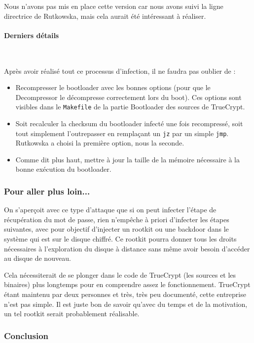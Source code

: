 \documentclass[12pt,a4paper]{article}
\begin{document}
Nous n'avons pas mis en place cette version car nous avons suivi la ligne
directrice de Rutkowska, mais cela aurait été intéressant à réaliser.


\paragraph{Derniers détails} ~

Après avoir réalisé tout ce processus d'infection, il ne faudra pas oublier de :
\begin{itemize}
    \item Recompresser le bootloader avec les bonnes options (pour que le
    Decompressor le décompresse correctement lors du boot). Ces options sont
    visibles dans le \texttt{Makefile} de la partie Bootloader des sources de TrueCrypt.
    \item Soit recalculer la checksum du bootloader infecté une fois recompressé,
    soit tout simplement l'outrepasser en remplaçant un \texttt{jz} par un simple
    \texttt{jmp}. Rutkowska a choisi la première option, nous la seconde.
    \item Comme dit plus haut, mettre à jour la taille de la mémoire nécessaire
    à la bonne exécution du bootloader.
\end{itemize}

\subsubsection{Pour aller plus loin...}

On s'aperçoit avec ce type d'attaque que si on peut infecter l'étape de
récupération du mot de passe, rien n'empêche à priori d'infecter les étapes 
suivantes, avec pour objectif d'injecter un rootkit ou une backdoor dans le
système qui est sur le disque chiffré. Ce rootkit pourra donner tous les droits
nécessaires à l'exploration du disque à distance sans même avoir besoin
d'accéder au disque de nouveau.

Cela nécessiterait de se plonger dans le code de TrueCrypt (les sources et les
binaires) plus longtemps pour en comprendre assez le fonctionnement. TrueCrypt
étant maintenu par deux personnes et très, très peu documenté, cette entreprise
n'est pas simple. Il est juste bon de savoir qu'avec du temps et de la motivation,
un tel rootkit serait probablement réalisable.

\subsubsection{Conclusion}
\end{document}
